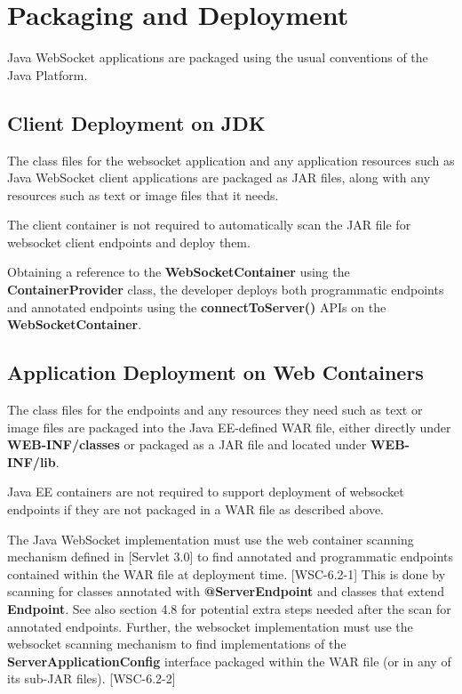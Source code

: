 \chapter{Packaging and Deployment}

Java WebSocket applications are packaged using the usual conventions of the Java Platform.

\section{Client Deployment on JDK}

The class files for the websocket application and any application resources such as Java WebSocket client applications are packaged as JAR files, along with any resources such as text or image files that it needs. 

The client container is not required to automatically scan the JAR file for websocket client endpoints and deploy them.

Obtaining a reference to the \textbf{WebSocketContainer} using the \textbf{ContainerProvider} class, the developer deploys both programmatic endpoints and annotated endpoints using the \textbf{connectToServer()} APIs on the \textbf{WebSocketContainer}.

\section{Application Deployment on Web Containers}

The class files for the endpoints and any resources they need such as text or image files are packaged into the Java EE-defined WAR file, either directly under \textbf{WEB-INF/classes} or packaged as a JAR file and located under \textbf{WEB-INF/lib}.

Java EE containers are not required to support deployment of websocket endpoints if they are not packaged in a WAR file as described above.

The Java WebSocket implementation must use the web container scanning mechanism defined in [Servlet 3.0] to find annotated and programmatic endpoints contained within the WAR file at deployment time. [WSC-6.2-1]  This is done by scanning for classes annotated with \textbf{@ServerEndpoint} and classes that extend \textbf{Endpoint}. See also section 4.8 for potential extra steps needed after the scan for annotated endpoints. Further, the websocket implementation must use the websocket scanning mechanism to find implementations of the \textbf{ServerApplicationConfig} interface packaged within the WAR file (or in any of its sub-JAR files). [WSC-6.2-2]

